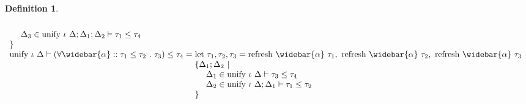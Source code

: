 \documentclass[manuscript]{acmart}
\theoremstyle{definition}
\newtheorem{definition}{Definition}[section]
\begin{document}
\begin{definition}
\[\begin{array}{l @{} l}
\begin{array}[t]{@{} l}
      \\
      \ \ \ \ \Delta_3 \in \text{unify } \iota\ \Delta;\Delta_1;\Delta_2 \vdash \tau_1 \leq \tau_4
      \\ 
      \}
    \end{array}
    \\
    \text{unify } \iota\ \Delta \vdash
    (\forall \widebar{\alpha} :: \tau_1 \leq \tau_2\ .\ \tau_3)
    \leq 
    \tau_4
    &{} = 
    \begin{array}[t]{@{} l}
      \text{let } \tau_1, \tau_2, \tau_3 = 
      \text{refresh } \widebar{\alpha}\ \tau_1,\ 
      \text{refresh } \widebar{\alpha}\ \tau_2,\ 
      \text{refresh } \widebar{\alpha}\ \tau_3
      \\
      \{\Delta_1;\Delta_2\ |
      \\ 
      \ \ \ \ \Delta_1 \in \text{unify } \iota\ \Delta \vdash \tau_3 \leq \tau_4
      \\
      \ \ \ \ \Delta_2 \in \text{unify } \iota\ \Delta;\Delta_1 \vdash \tau_1 \leq \tau_2
      \\
      \}
    \end{array}

  \end{array}
\]
\end{definition}
\end{document}
